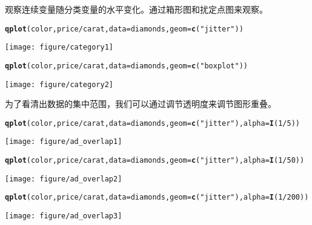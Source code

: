 \documentclass{article}\usepackage[]{graphicx}\usepackage[]{color}
\makeatletter
\def\maxwidth{ %
  \ifdim\Gin@nat@width>\linewidth
    \linewidth
  \else
    \Gin@nat@width
  \fi
}
\newcommand{\hlnum}[1]{\textcolor[rgb]{0.686,0.059,0.569}{#1}}%
\newcommand{\hlstr}[1]{\textcolor[rgb]{0.192,0.494,0.8}{#1}}%
\newcommand{\hlopt}[1]{\textcolor[rgb]{0,0,0}{#1}}%
\newcommand{\hlstd}[1]{\textcolor[rgb]{0.345,0.345,0.345}{#1}}%
\newcommand{\hlkwc}[1]{\textcolor[rgb]{0.333,0.667,0.333}{#1}}%
\newcommand{\hlkwd}[1]{\textcolor[rgb]{0.737,0.353,0.396}{\textbf{#1}}}%
\newenvironment{kframe}{%
 \def\at@end@of@kframe{}%
 \ifinner\ifhmode%
  \def\at@end@of@kframe{\end{minipage}}%
  \begin{minipage}{\columnwidth}%
 \fi\fi%
 \def\FrameCommand##1{\hskip\@totalleftmargin \hskip-\fboxsep
 \colorbox{shadecolor}{##1}\hskip-\fboxsep
     \hskip-\linewidth \hskip-\@totalleftmargin \hskip\columnwidth}%
 \MakeFramed {\advance\hsize-\width
   \@totalleftmargin\z@ \linewidth\hsize
   \@setminipage}}%
 {\par\unskip\endMakeFramed%
 \at@end@of@kframe}
\newenvironment{knitrout}{}{} %
\makeatother
\begin{document}
\begin{CJK*}{UTF8}{gkai}
\begin{knitrout}
\end{knitrout}
观察连续变量随分类变量的水平变化。通过箱形图和扰定点图来观察。
\begin{knitrout}
\color{fgcolor}\begin{kframe}
\begin{alltt}
\hlkwd{qplot}\hlstd{(color, price}\hlopt{/}\hlstd{carat,} \hlkwc{data} \hlstd{= diamonds,} \hlkwc{geom} \hlstd{=} \hlkwd{c}\hlstd{(}\hlstr{"jitter"}\hlstd{))}
\end{alltt}
\end{kframe}
\texttt{[image: figure/category1]} 
\begin{kframe}\begin{alltt}
\hlkwd{qplot}\hlstd{(color, price}\hlopt{/}\hlstd{carat,} \hlkwc{data} \hlstd{= diamonds,} \hlkwc{geom} \hlstd{=} \hlkwd{c}\hlstd{(}\hlstr{"boxplot"}\hlstd{))}
\end{alltt}
\end{kframe}
\texttt{[image: figure/category2]} 

\end{knitrout}
为了看清出数据的集中范围，我们可以通过调节透明度来调节图形重叠。
\begin{knitrout}
\color{fgcolor}\begin{kframe}
\begin{alltt}
\hlkwd{qplot}\hlstd{(color, price}\hlopt{/}\hlstd{carat,} \hlkwc{data} \hlstd{= diamonds,} \hlkwc{geom} \hlstd{=} \hlkwd{c}\hlstd{(}\hlstr{"jitter"}\hlstd{),} \hlkwc{alpha} \hlstd{=} \hlkwd{I}\hlstd{(}\hlnum{1}\hlopt{/}\hlnum{5}\hlstd{))}
\end{alltt}
\end{kframe}
\texttt{[image: figure/ad\_overlap1]} 
\begin{kframe}\begin{alltt}
\hlkwd{qplot}\hlstd{(color, price}\hlopt{/}\hlstd{carat,} \hlkwc{data} \hlstd{= diamonds,} \hlkwc{geom} \hlstd{=} \hlkwd{c}\hlstd{(}\hlstr{"jitter"}\hlstd{),} \hlkwc{alpha} \hlstd{=} \hlkwd{I}\hlstd{(}\hlnum{1}\hlopt{/}\hlnum{50}\hlstd{))}
\end{alltt}
\end{kframe}
\texttt{[image: figure/ad\_overlap2]} 
\begin{kframe}\begin{alltt}
\hlkwd{qplot}\hlstd{(color, price}\hlopt{/}\hlstd{carat,} \hlkwc{data} \hlstd{= diamonds,} \hlkwc{geom} \hlstd{=} \hlkwd{c}\hlstd{(}\hlstr{"jitter"}\hlstd{),} \hlkwc{alpha} \hlstd{=} \hlkwd{I}\hlstd{(}\hlnum{1}\hlopt{/}\hlnum{200}\hlstd{))}
\end{alltt}
\end{kframe}
\texttt{[image: figure/ad\_overlap3]} 


\end{knitrout}
\end{CJK*}
\end{document}
